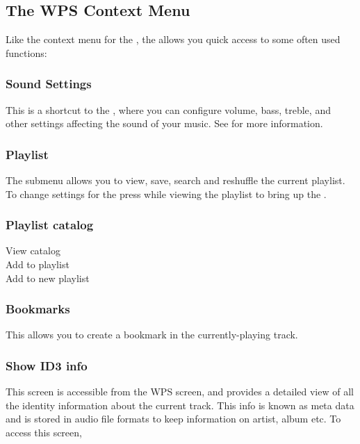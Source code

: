 \subsection{\label{sec:contextmenu}The WPS Context Menu}
Like the context menu for the , the  
allows you quick access to some often used functions:

\subsubsection{Sound Settings}
This is a shortcut to the , where you can configure volume,
bass, treble, and other settings affecting the sound of your music.  
See  for more information.

\subsubsection{Playlist}
The  submenu allows you to view, save, search and
reshuffle the current playlist. To change settings for the
 press \ActionStdMenu{} while viewing the playlist
to bring up the .
    
    \subsubsection{Playlist catalog}
      \begin{description}
        \item [View catalog]
        \item [Add to playlist]
        \item [Add to new playlist]
      \end{description}
\subsubsection{Bookmarks}
This allows you to create a bookmark in the currently-playing track.

\subsubsection{\label{ref:ID3viewer}Show ID3 info}
This screen is accessible from the WPS screen, and provides a detailed view of
all the identity information about the current track. This info is known as
meta data and is stored in audio file formats to keep information on artist,
album etc. To access this screen, %
%
%
%
